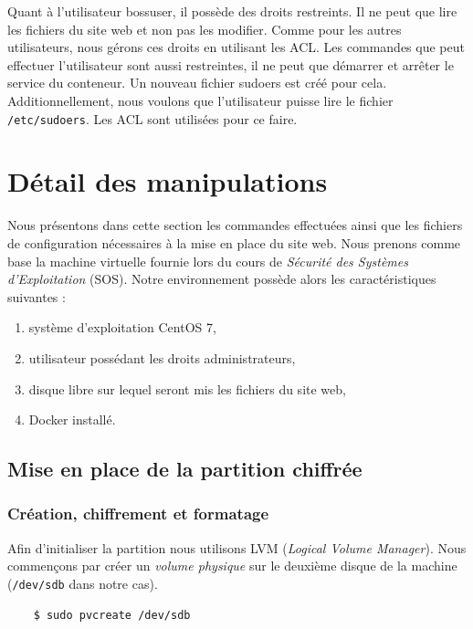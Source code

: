 \documentclass{extarticle} %
\begin{document}
     Quant à l'utilisateur bossuser, il possède des droits restreints. Il ne peut que lire les fichiers 
     du site web et non pas les modifier. Comme pour les autres utilisateurs, nous gérons ces droits en 
     utilisant les ACL. Les commandes que peut effectuer l'utilisateur sont aussi restreintes, il ne peut 
     que démarrer et arrêter le service du conteneur. Un nouveau fichier sudoers est créé pour cela. 
     Additionnellement, nous voulons que l'utilisateur puisse lire le fichier \texttt{/etc/sudoers}. Les 
     ACL sont utilisées pour ce faire.

    \section{Détail des manipulations}

    Nous présentons dans cette section les commandes effectuées ainsi que les fichiers de configuration nécessaires à la mise en place du site web.
     Nous prenons comme base la machine virtuelle fournie lors du cours de \textit{Sécurité des Systèmes d'Exploitation} (SOS). Notre environnement
      possède alors les caractéristiques suivantes :

    \begin{enumerate}[label=$\bullet$]
      \item système d'exploitation CentOS 7,
      \item utilisateur possédant les droits administrateurs,
      \item disque libre sur lequel seront mis les fichiers du site web,
      \item Docker installé.
    \end{enumerate}

    \subsection{Mise en place de la partition chiffrée}

    \subsubsection{Création, chiffrement et formatage}

    Afin d'initialiser la partition nous utilisons LVM (\textit{Logical Volume Manager}). Nous commençons par créer un \textit{volume physique}
    sur le deuxième disque de la machine (\texttt{/dev/sdb} dans notre cas).

    \begin{verbatim}
    $ sudo pvcreate /dev/sdb
    \end{verbatim}
\end{document}
